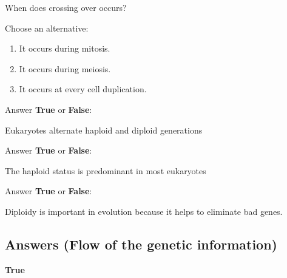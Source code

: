 \begin{Exercise} [
  title={Crossing-Over (2)},
  difficulty={1},
  label={ex10},
  origin={G. Valle}
 ]

  \Question When does crossing over occurs?

Choose an alternative:

\begin{enumerate}
  \item It occurs during mitosis.
  \item It occurs during meiosis.
  \item It occurs at every cell duplication.
\end{enumerate}

\end{Exercise}

\begin{Exercise} [
  title={Eukaryotes},
  difficulty={1},
  label={ex11},
  origin={G. Valle}
 ]

Answer \textbf{True} or \textbf{False}:

  \Question Eukaryotes alternate haploid and diploid generations

\end{Exercise}

\begin{Exercise} [
  title={Haploidy},
  difficulty={1},
  label={ex12},
  origin={G. Valle}
 ]

Answer \textbf{True} or \textbf{False}:

  \Question The haploid status is predominant in most eukaryotes

\end{Exercise}

\begin{Exercise} [
  title={Diploidy},
  difficulty={1},
  label={ex13},
  origin={G. Valle}
 ]

Answer \textbf{True} or \textbf{False}:

  \Question Diploidy is important in evolution because it helps to eliminate
bad genes.

\end{Exercise}

\subsection{Answers (Flow of the genetic information)}

\begin{Answer} [
   ref={ex7},
   number={7}
 ]

  \Question \textbf{True}

\end{Answer}

